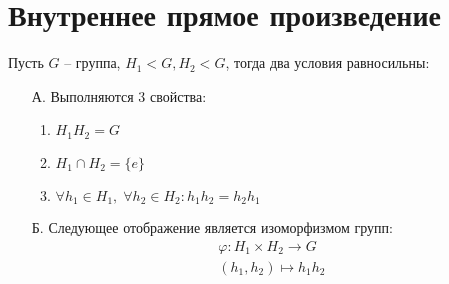 \section{Внутреннее прямое произведение}
\begin{theorem} Пусть $G$ -- группа, $H_1 < G, H_2 < G$, тогда два условия равносильны: 
    \begin{itemize}
        \item[А.] Выполняются 3 свойства: 
        \begin{enumerate}
            \item $H_1 H_2 = G$
            \item $H_1 \cap H_2 = \{e\}$
            \item $\forall h_1 \in H_1, \; \forall h_2 \in H_2 : h_1 h_2 = h_2 h_1$
        \end{enumerate} 
        \item[Б.] Следующее отображение является изоморфизмом групп:  
        \begin{gather*}
            \varphi : H_1 \times H_2 \longrightarrow G \\
            (h_1, h_2) \longmapsto h_1 h_2
        \end{gather*}
    \end{itemize}
\end{theorem}
